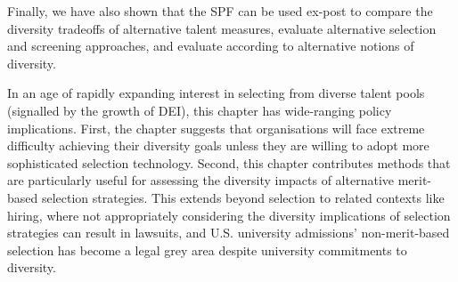 Finally, we have also shown that the SPF can be used ex-post to compare the diversity tradeoffs of alternative talent measures, evaluate alternative selection and screening approaches, and evaluate according to alternative notions of diversity. 

In an age of rapidly expanding interest in selecting from diverse talent pools (signalled by the growth of DEI), this chapter has wide-ranging policy implications. First, the chapter suggests that organisations will face extreme difficulty achieving their diversity goals unless they are willing to adopt more sophisticated selection technology. Second, this chapter contributes methods that are particularly useful for assessing the diversity impacts of alternative merit-based selection strategies. This extends beyond selection to related contexts like hiring, where not appropriately considering the diversity implications of selection strategies can result in lawsuits, and U.S. university admissions' non-merit-based selection has become a legal grey area despite university commitments to diversity. 